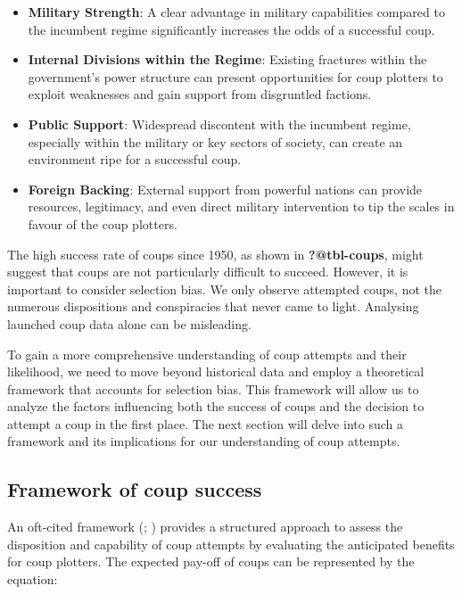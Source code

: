 \documentclass[
  12pt,
]{report}
\begin{document}
\begin{itemize}
\item
  \textbf{Military Strength}: A clear advantage in military capabilities
  compared to the incumbent regime significantly increases the odds of a
  successful coup.
\item
  \textbf{Internal Divisions within the Regime}: Existing fractures
  within the government's power structure can present opportunities for
  coup plotters to exploit weaknesses and gain support from disgruntled
  factions.
\item
  \textbf{Public Support}: Widespread discontent with the incumbent
  regime, especially within the military or key sectors of society, can
  create an environment ripe for a successful coup.
\item
  \textbf{Foreign Backing}: External support from powerful nations can
  provide resources, legitimacy, and even direct military intervention
  to tip the scales in favour of the coup plotters.
\end{itemize}

The high success rate of coups since 1950, as shown in
\textbf{?@tbl-coups}, might suggest that coups are not particularly
difficult to succeed. However, it is important to consider selection
bias. We only observe attempted coups, not the numerous dispositions and
conspiracies that never came to light. Analysing launched coup data
alone can be misleading.

To gain a more comprehensive understanding of coup attempts and their
likelihood, we need to move beyond historical data and employ a
theoretical framework that accounts for selection bias. This framework
will allow us to analyze the factors influencing both the success of
coups and the decision to attempt a coup in the first place. The next
section will delve into such a framework and its implications for our
understanding of coup attempts.

\subsection{Framework of coup success}\label{framework-of-coup-success}

An oft-cited framework (; ) provides a
structured approach to assess the disposition and capability of coup
attempts by evaluating the anticipated benefits for coup plotters. The
expected pay-off of coups can be represented by the equation:
\end{document}
